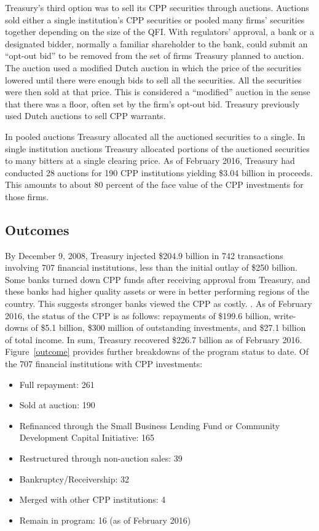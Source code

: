 \documentclass[12pt]{article}
\begin{document}
Treasury's third option was to sell its CPP securities through auctions. Auctions sold either a single institution's CPP securities or pooled many firms' securities together depending on the size of the QFI. With regulators' approval, a bank or a designated bidder, normally a familiar shareholder to the bank, could submit an ``opt-out bid'' to be removed from the set of firms Treasury planned to auction. The auction used a modified Dutch auction in which the price of the securities lowered until there were enough bids to sell all the securities. All the securities were then sold at that price. This is considered a ``modified'' auction in the sense that there was a floor, often set by the firm's opt-out bid. Treasury previously used Dutch auctions to sell CPP warrants.

In pooled auctions Treasury allocated all the auctioned securities to a single. In single institution auctions Treasury allocated portions of the auctioned securities to many bitters at a single clearing price. As of February 2016, Treasury had conducted 28 auctions for 190 CPP institutions yielding \$3.04 billion in proceeds. This amounts to about 80 percent of the face value of the CPP investments for those firms.

\subsection{Outcomes}

By December 9, 2008, Treasury injected \$204.9 billion in 742 transactions involving 707 financial institutions, less than the initial outlay of \$250 billion. Some banks turned down CPP funds after receiving approval from Treasury, and these banks had higher quality assets or were in better performing regions of the country. This suggests stronger banks viewed the CPP as costly. \citep{Ba}. As of February 2016, the status of the CPP is as follows: repayments of \$199.6 billion, write-downs of \$5.1 billion, \$300 million of outstanding investments, and \$27.1 billion of total income. In sum, Treasury recovered \$226.7 billion as of February 2016. Figure~\ref{outcome} provides further breakdowns of the program status to date. Of the 707 financial institutions with CPP investments:
\begin{itemize}[label={--}]
\item Full repayment: 261
\item Sold at auction: 190
\item Refinanced through the Small Business Lending Fund or Community Development Capital Initiative: 165
\item Restructured through non-auction sales: 39
\item Bankruptcy/Receivership: 32
\item Merged with other CPP institutions: 4
\item Remain in program: 16 (as of February 2016)
\end{itemize}
\citep{GAO}
\end{document}
